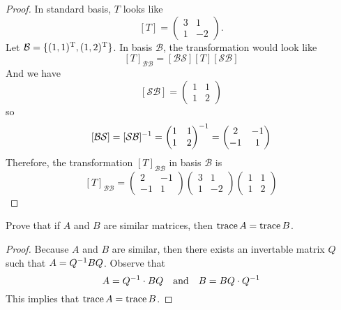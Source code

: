 \begin{proof}
  In standard basis, $T$ looks like
  \[ [T]= \begin{pmatrix} 3 &1\\ 1 &-2 \end{pmatrix}.\]
  Let $\mathcal{B}=\{(1,1)^\mathrm{T}, (1,2)^\mathrm{T}\}$. In basis $\mathcal{B}$,
  the transformation would look like
  \[
    [T]_{\mathcal{BB}}= [\mathcal{BS}] [T] [\mathcal{SB}]
  \]
  And we have
  \[ [\mathcal{SB}]= \begin{pmatrix} 1 &1\\ 1 &2 \end{pmatrix} \]
  so
  \[
    [\mathcal{BS}]= [\mathcal{SB}]^{-1}=
    \begin{pmatrix} 1 &1\\ 1 &2 \end{pmatrix}^{-1}=
    \begin{pmatrix} 2 &-1\\ -1&1 \end{pmatrix}
  \]
  Therefore, the transformation $[T]_{\mathcal{BB}}$ in basis
  $\mathcal{B}$ is
  \[
    [T]_{\mathcal{BB}}=
    \begin{pmatrix} 2 &-1\\ -1&1 \end{pmatrix}
    \begin{pmatrix} 3 &1\\ 1 &-2 \end{pmatrix}
    \begin{pmatrix} 1 &1\\ 1 &2 \end{pmatrix} 
  \]
\end{proof}
\begin{exercise}
  Prove that if $A$ and $B$ are similar matrices, then
  $\operatorname{trace} A=\operatorname{trace} B$.
\end{exercise}
\begin{proof}
  Because $A$ and $B$ are similar, then there exists 
  an invertable matrix $Q$ such that $A=Q^{-1} BQ$. Observe that
  \[
    A=Q^{-1}\cdot BQ
    \quad\text{and}\quad
    B=BQ\cdot Q^{-1}
  \]
  This implies that $\operatorname{trace} A=\operatorname{trace} B$.
\end{proof}





